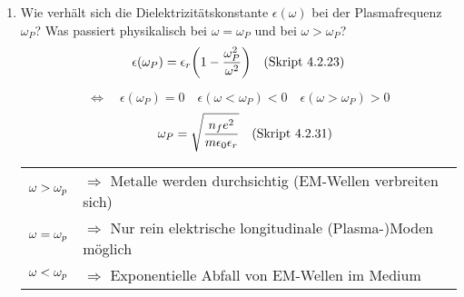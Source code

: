 \begin{enumerate}
  \item Wie verhält sich die Dielektrizitätskonstante $\epsilon(\omega)$ %
        bei der Plasmafrequenz $\omega_P$? Was passiert physikalisch bei
        $\omega=\omega_P$ und bei $\omega>\omega_P$?
        $$
        \epsilon(\omega_P)=\epsilon_r\qty(1-\frac{\omega_P^2}{\omega^2})
        \quad\text{(Skript 4.2.23)}$$
        \begin{center}
        \end{center}
        $$\Leftrightarrow\quad\epsilon(\omega_P)=0
        \quad\epsilon(\omega<\omega_P)<0 
        \quad\epsilon(\omega>\omega_P)>0$$
        $$\quad\omega_P=\sqrt{\frac{n_fe^2}
        {m\epsilon_0\epsilon_r}}\quad\text{(Skript 4.2.31)}$$
        \begin{tabular}{rl}
          $\displaystyle\omega>\omega_p$ &$\Rightarrow$ 
          Metalle werden durchsichtig (EM-Wellen verbreiten sich)\\
          $\displaystyle\omega=\omega_p$ &$\Rightarrow$ 
          Nur rein elektrische longitudinale (Plasma-)Moden möglich\\
          $\displaystyle\omega<\omega_p$& $\Rightarrow$ Exponentielle 
          Abfall von EM-Wellen im Medium
        \end{tabular}
        \begin{center}
        \end{center}

\end{enumerate}
